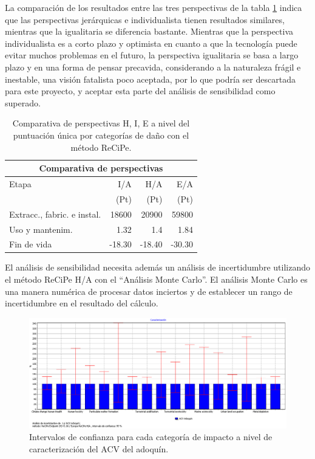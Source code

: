 La comparación de los resultados entre las tres perspectivas de la tabla \ref{comparativa_perspectivas} indica que las perspectivas jerárquicas e individualista tienen resultados similares, mientras que la igualitaria se diferencia bastante. Mientras que la perspectiva individualista es a corto plazo y optimista en cuanto a que la tecnología puede evitar muchos problemas en el futuro, la perspectiva igualitaria se basa a largo plazo y en una forma de pensar precavida, considerando a la naturaleza frágil e inestable, una visión fatalista poco aceptada, por lo que podría ser descartada para este proyecto, y aceptar esta parte del análisis de sensibilidad como superado.

\begin{table}[!htb]
\centering
\begin{tabular}{p{6cm}rrr}
\toprule
\multicolumn{4}{c}{Comparativa de perspectivas}\\
\midrule
Etapa & I/A & H/A & E/A\\
 & (Pt) & (Pt) & (Pt)\\
\midrule
Extracc., fabric. e instal. & 18600 & 20900 & 59800\\
Uso y mantenim. & 1.32 & 1.4 & 1.84\\
Fin de vida & -18.30 & -18.40 & -30.30\\
\bottomrule
\end{tabular}
\caption{Comparativa de perspectivas H, I, E a nivel del puntuación única por categorías de daño con el método ReCiPe.}
\label{comparativa_perspectivas}
\end{table}

El análisis de sensibilidad necesita además un análisis de incertidumbre utilizando el método ReCiPe H/A con el ``Análisis Monte Carlo''. El análisis Monte Carlo es una manera numérica de procesar datos inciertos y de establecer un rango de incertidumbre en el resultado del cálculo.

\begin{figure}[!htb]
\centering
\includegraphics[width=15cm]{img/confianza_caracterizacion.png}
\caption{Intervalos de confianza para cada categoría de impacto a nivel de caracterización del ACV del adoquín.}
\label{fig:confianza_caracterizacion}
\end{figure}

